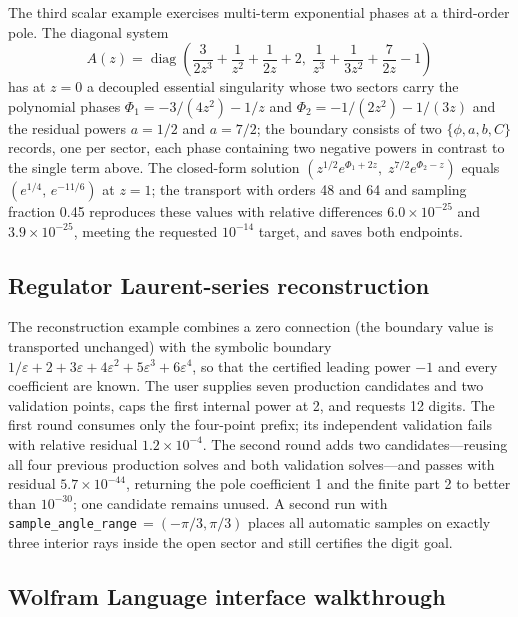 \documentclass[11pt,a4paper]{article}
\newcommand{\diag}{\operatorname{diag}}
\begin{document}
The third scalar example exercises multi-term exponential phases at a third-order pole.
The diagonal system
\begin{equation}
  A(z)=\diag\!\left(\frac{3}{2z^{3}}+\frac{1}{z^{2}}+\frac{1}{2z}+2,\;
  \frac{1}{z^{3}}+\frac{1}{3z^{2}}+\frac{7}{2z}-1\right)
  \label{eq:exponential-polynomial-system}
\end{equation}
has at $z=0$ a decoupled essential singularity whose two sectors carry the polynomial
phases $\Phi_{1}=-3/(4z^{2})-1/z$ and $\Phi_{2}=-1/(2z^{2})-1/(3z)$ and the residual
powers $a=1/2$ and $a=7/2$; the boundary consists of two $\{\phi,a,b,C\}$ records, one per
sector, each phase containing two negative powers in contrast to the single term above.
The closed-form solution $(z^{1/2}e^{\Phi_{1}+2z},\;z^{7/2}e^{\Phi_{2}-z})$ equals
$(e^{1/4},\,e^{-11/6})$ at $z=1$; the transport with orders 48 and 64 and sampling
fraction 0.45 reproduces these values with relative differences $6.0\times10^{-25}$ and
$3.9\times10^{-25}$, meeting the requested $10^{-14}$ target, and saves both endpoints.

\subsection{Regulator Laurent-series reconstruction}
\label{sec:example-reconstruction}

The reconstruction example combines a zero connection (the boundary value is transported
unchanged) with the symbolic boundary
$1/\varepsilon+2+3\varepsilon+4\varepsilon^{2}+5\varepsilon^{3}+6\varepsilon^{4}$, so that
the certified leading power $-1$ and every coefficient are known. The user supplies seven
production candidates and two validation points, caps the first internal power at 2, and
requests 12 digits. The first round consumes only the four-point prefix; its independent
validation fails with relative residual $1.2\times10^{-4}$. The second round adds two
candidates---reusing all four previous production solves and both validation solves---and
passes with residual $5.7\times10^{-44}$, returning the pole coefficient 1 and the finite
part 2 to better than $10^{-30}$; one candidate remains unused. A second run with
\texttt{sample\_angle\_range}$\,=(-\pi/3,\pi/3)$ places all automatic samples on exactly
three interior rays inside the open sector and still certifies the digit goal.

\subsection{Wolfram Language interface walkthrough}
\label{sec:example-wolfram}
\end{document}
